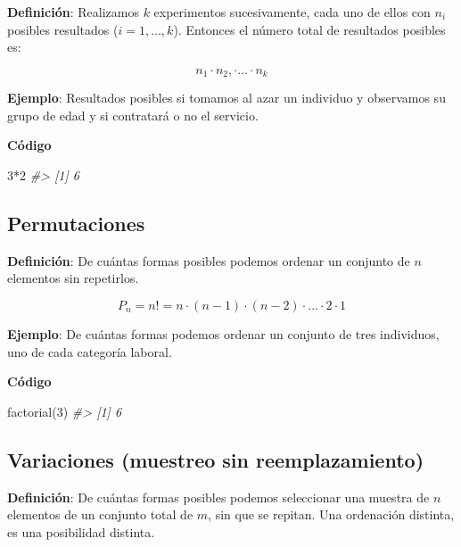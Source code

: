 \documentclass[
]{book}
\newenvironment{Shaded}{\begin{snugshade}}{\end{snugshade}}
\newcommand{\CommentTok}[1]{\textcolor[rgb]{0.56,0.35,0.01}{\textit{#1}}}
\newcommand{\DecValTok}[1]{\textcolor[rgb]{0.00,0.00,0.81}{#1}}
\newcommand{\FunctionTok}[1]{\textcolor[rgb]{0.00,0.00,0.00}{#1}}
\newcommand{\NormalTok}[1]{#1}
\newcommand{\SpecialCharTok}[1]{\textcolor[rgb]{0.00,0.00,0.00}{#1}}
\begin{document}
\textbf{Definición}: Realizamos \(k\) experimentos sucesivamente, cada
uno de ellos con \(n_i\) posibles resultados (\(i=1, \ldots, k\)). Entonces
el número total de resultados posibles es:

\[n_1\cdot n_2, \cdot \ldots \cdot n_k\]

\textbf{Ejemplo}: Resultados posibles si tomamos al azar un individuo
y observamos su grupo de edad y si contratará o no el servicio.

\textbf{Código}

\begin{Shaded}
\begin{Highlighting}[]
\DecValTok{3}\SpecialCharTok{*}\DecValTok{2}
\CommentTok{\#\textgreater{} [1] 6}
\end{Highlighting}
\end{Shaded}

\hypertarget{permutaciones}{%
\subsection{Permutaciones}\label{permutaciones}}

\textbf{Definición}: De cuántas formas posibles podemos ordenar un
conjunto de \(n\) elementos sin repetirlos.

\[P_n = n! = n\cdot(n-1)\cdot(n-2)\cdot\ldots\cdot 2\cdot 1\]

\textbf{Ejemplo}: De cuántas formas podemos ordenar un conjunto de
tres individuos, uno de cada categoría laboral.

\textbf{Código}

\begin{Shaded}
\begin{Highlighting}[]
\FunctionTok{factorial}\NormalTok{(}\DecValTok{3}\NormalTok{)}
\CommentTok{\#\textgreater{} [1] 6}
\end{Highlighting}
\end{Shaded}

\hypertarget{variaciones-muestreo-sin-reemplazamiento}{%
\subsection{Variaciones (muestreo sin reemplazamiento)}\label{variaciones-muestreo-sin-reemplazamiento}}

\textbf{Definición}: De cuántas formas posibles podemos seleccionar
una muestra de \(n\) elementos de un conjunto total de \(m\), sin que se
repitan. Una ordenación distinta, es una posibilidad distinta.
\end{document}
